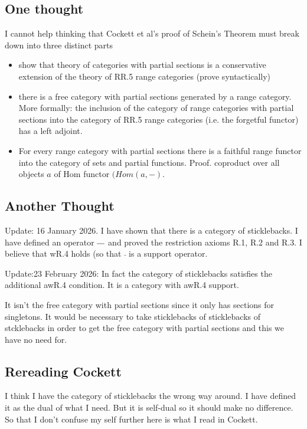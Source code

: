 

\subsection{One thought}
I cannot help thinking that Cockett et al's proof of Schein's Theorem must break down into three
distinct parts
\begin{itemize}
       \item show that theory of categories with partial sections is a conservative extension of the theory of RR.5 range categories (prove syntactically)
       \item there is a free category with partial sections generated by a range category. 
              More formally:  
              the inclusion of the category of range categories with partial sections  
              into the  category of RR.5 range categories (i.e. the forgetful functor) has a left adjoint.
       \item For every range category with partial sections there is a faithful range functor into the
             category of sets and partial functions. Proof. coproduct over all objects $a$ of Hom functor $(Hom(a,-)$.  
\end{itemize}

\subsection{Another Thought}

 Update: 16 January 2026. I have shown that there is a category of sticklebacks. I have defined an operator
 $\overline{\ \kern0.2cm}$ and proved the restriction axioms R.1, R.2 and R.3. I believe that wR.4 holds 
 (so that $\bar{\ }$ is a support operator. 

 Update:23 February 2026: In fact the category of sticklebacks satisfies the additional 
 awR.4 condition. It is a category with awR.4 support.

 It isn't the free category with partial sections since it only has sections for 
 singletons. It would be necessary to take sticklebacks of sticklebacks of stcklebacks in order to get the free category with partial sections and this we have no need for.


\subsection{Rereading Cockett}
I think I have the category of sticklebacks the wrong way around. I have defined it as the dual of what I need. But it is self-dual so it should make no difference. So that I don't confuse my self further here is what I read in Cockett.  

